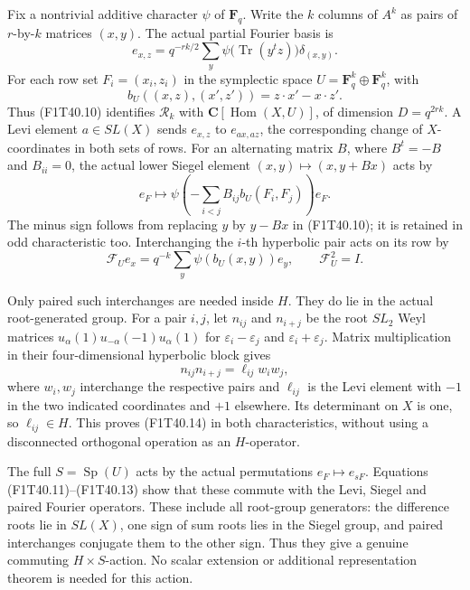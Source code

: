 Fix a nontrivial additive character \(\psi\) of
\(\mathbf F_q\). Write the \(k\) columns of \(A^k\)
as pairs of \(r\)-by-\(k\) matrices \((x,y)\).
The actual partial Fourier basis is
\[
 e_{x,z}=q^{-rk/2}\sum_y\psi\bigl(\operatorname{Tr}(y^tz)\bigr)
                                     \delta_{(x,y)}.
 \tag{F1T40.10}
\]
For each row set \(F_i=(x_i,z_i)\) in the symplectic
space \(U=\mathbf F_q^k\oplus\mathbf F_q^k\), with
\[
 b_U((x,z),(x',z'))=z\cdot x'-x\cdot z'.
 \tag{F1T40.11}
\]
Thus (F1T40.10) identifies \(\mathcal R_k\) with
\(\mathbf C[\operatorname{Hom}(X,U)]\), of dimension
\(D=q^{2rk}\). A Levi element \(a\in SL(X)\)
sends \(e_{x,z}\) to \(e_{ax,az}\), the corresponding
change of \(X\)-coordinates in both sets of rows. For an alternating
matrix \(B\), where \(B^t=-B\) and \(B_{ii}=0\), the
actual lower Siegel element \((x,y)\mapsto(x,y+Bx)\) acts by
\[
 e_F\longmapsto
 \psi\!\left(-\sum_{i<j}B_{ij}b_U(F_i,F_j)\right)e_F.
 \tag{F1T40.12}
\]
The minus sign follows from replacing \(y\) by \(y-Bx\)
in (F1T40.10); it is retained in odd characteristic too.
Interchanging the \(i\)-th hyperbolic pair acts on its
row by
\[
 \mathcal F_U e_x=q^{-k}\sum_y\psi(b_U(x,y))e_y,
                  \qquad \mathcal F_U^2=I.
 \tag{F1T40.13}
\]

Only paired such interchanges are needed inside \(H\).
They do lie in the actual root-generated group. For a pair
\(i,j\), let \(n_{ij}\) and \(n_{i+j}\) be the root
\(SL_2\) Weyl matrices
\(u_\alpha(1)u_{-\alpha}(-1)u_\alpha(1)\)
for \(\varepsilon_i-\varepsilon_j\) and
\(\varepsilon_i+\varepsilon_j\). Matrix multiplication
in their four-dimensional hyperbolic block gives
\[
 n_{ij}n_{i+j}=\ell_{ij}w_iw_j,
 \tag{F1T40.14}
\]
where \(w_i,w_j\) interchange the respective pairs and
\(\ell_{ij}\) is the Levi element with \(-1\) in the
two indicated coordinates and \(+1\) elsewhere.
Its determinant on \(X\) is one, so \(\ell_{ij}\in H\).
This proves (F1T40.14) in both characteristics, without
using a disconnected orthogonal operation as an \(H\)-operator.

The full \(S=\operatorname{Sp}(U)\) acts by the actual
permutations \(e_F\mapsto e_{sF}\). Equations
(F1T40.11)--(F1T40.13) show that these commute with the
Levi, Siegel and paired Fourier operators. These include
all root-group generators: the difference roots lie in
\(SL(X)\), one sign of sum roots lies in the Siegel group,
and paired interchanges conjugate them to the other sign.
Thus they give a genuine commuting \(H\times S\)-action.
No scalar extension or additional representation theorem
is needed for this action.

